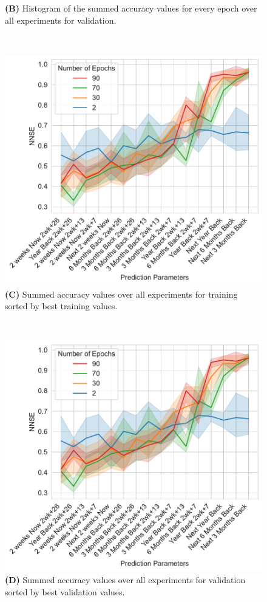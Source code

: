 \documentclass[utf8]{FrontiersinVancouver} %
\begin{document}
\begin{figure}[p]
\begin{center}
\begin{minipage}[t]{0.49\textwidth}
        {\bf (B)} Histogram of the summed accuracy values for every epoch over all experiments for validation.
     \end{minipage}
  \ \
     \begin{minipage}[t]{0.49\textwidth}
        \includegraphics[width=1.0\linewidth]{images/NNSE-all-epochs-training-summed}
        {\bf (C)} Summed accuracy values over all experiments for training sorted by best training values.
     \end{minipage}
  \ \
     \begin{minipage}[t]{0.49\textwidth}
        \includegraphics[width=1.0\linewidth]{images/NNSE-all-epochs-validation-summed}
        {\bf (D)} Summed accuracy values over all experiments for validation sorted by best validation values.
     \end{minipage}


\end{center}
\end{figure}
\end{document}
